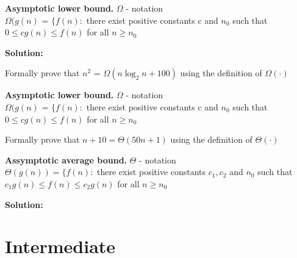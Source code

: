 \documentclass[11pt,fleqn]{book}
\begin{document}
\begin{definition}\textbf{Asymptotic lower bound.} $\Omega $ -  notation\\
    $\Omega(g(n) \text{ = } \{f(n) : $ there exist positive constants c and $n_0$  such that\\ $0 \leq cg(n) \leq f(n)$ for all $n \geq n_0$
\end{definition}
\textbf{Solution: } 

\begin{example}
 Formally prove that $n^2 \text{ = }\Omega(n\log_2n + 100)$ using the definition of $\Omega(\cdot)$
\end{example}
\begin{definition}\textbf{Asymptotic lower bound.} $\Omega $ -  notation\\
    $\Omega(g(n) \text{ = } \{f(n) : $ there exist positive constants c and $n_0$ such that\\ $0 \leq cg(n) \leq f(n)$ for all $n \geq n_0$
\end{definition}
\begin{example}
 Formally prove that $n + 10 = \Theta(50n + 1)$ using the definition of $\Theta(\cdot)$
\end{example}
\begin{definition}\textbf{Assymptotic average bound.} $\Theta$ - notation\\
    $\Theta(g(n)) = \{ f(n) : $ there exist positive constants $c_1, c_2$ and $n_0$ such that\\ $c_1g(n) \leq f(n) \leq c_2g(n)$ for all $n \geq n_0$ 
\end{definition}
\textbf{Solution: } 

\section{Intermediate}
\end{document}
